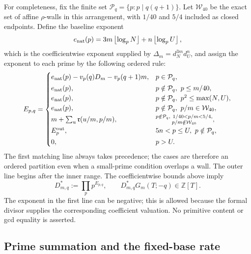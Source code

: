 For completeness, fix the finite set \(\mathcal P_q=\{p:p\mid q(q+1)\}\).  Let
\(\mathcal W_{40}\) be the exact set of affine \(\rho\)-walls in this
arrangement, with \(1/40\) and \(5/4\) included as closed endpoints.  Define
the baseline exponent
\[
 e_{\rm nat}(p)=3m\left\lfloor\log_p N\right\rfloor
                 +n\left\lfloor\log_p U\right\rfloor,
\]
which is the coefficientwise exponent supplied by \(\Delta_m=d_N^{3m}d_U^n\),
and assign the exponent to each prime by the following ordered rule:
\[
 E_{p,q}=\begin{cases}
 e_{\rm nat}(p)-v_p(q)D_m-v_p(q+1)m,&p\in\mathcal P_q,\\[2pt]
 e_{\rm nat}(p),&p\notin\mathcal P_q,\ p\le m/40,\\
 e_{\rm nat}(p),&p\notin\mathcal P_q,\ p^2\le\max(N,U),\\
 e_{\rm nat}(p),&p\notin\mathcal P_q,\ p/m\in\mathcal W_{40},\\[2pt]
 m+\sum_u\mathfrak r(u/m,p/m),&
 \substack{p\notin\mathcal P_q,\ 1/40<p/m<5/4,\\ p/m\notin\mathcal W_{40}},\\[2pt]
 E_p^{\rm out},&5n<p\le U,\ p\notin\mathcal P_q,\\[2pt]
 0,&p>U.
 \end{cases}
\]
The first matching line always takes precedence; the cases are therefore an
ordered partition even when a small-prime condition overlaps a wall.
The outer line begins after the inner range.
The coefficientwise bounds above imply
\[
 D^*_{m,q}:=\prod_p p^{E_{p,q}},\qquad
 D^*_{m,q}G_m(T;-q)\in\mathbb Z[T].
\]
The exponent in the first line can be negative; this is allowed because the
formal divisor supplies the corresponding coefficient valuation.  No primitive
content or gcd equality is asserted.

\subsection{Prime summation and the fixed-base rate}

